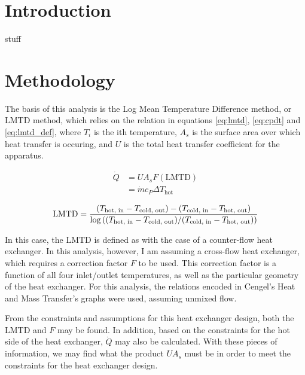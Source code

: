 \documentclass[12pt,letterpaper]{article}
\begin{document}
\sffamily

\section{Introduction}

stuff

\section{Methodology}

The basis of this analysis is the Log Mean Temperature Difference method, or LMTD method, which relies on the relation in equations \ref{eq:lmtd}, \ref{eq:cpdt} and \ref{eq:lmtd_def}, where \(T_i\) is the ith temperature, \(A_s\) is the surface area over which heat transfer is occuring, and \(U\) is the total heat transfer coefficient for the apparatus.

\begin{align}
\label{eq:lmtd}
\dot{Q} &= UA_s F(\textrm{LMTD})\\
\label{eq:cpdt}
        &= \dot{m}c_P \Delta T_{\textrm{hot}}
\end{align}

\begin{equation}
\label{eq:lmtd_def}
\textrm{LMTD} = 
\frac{ (T_{\textrm{hot, in}} - T_{\textrm{cold, out}} ) -
       (T_{\textrm{cold, in}} - T_{\textrm{hot, out}})
     }{
\log\left( 
    (T_{\textrm{hot, in}} - T_{\textrm{cold, out}} )
    \middle/ 
    (T_{\textrm{cold, in}} - T_{\textrm{hot, out}}) 
    \right) }
\end{equation}

In this case, the LMTD is defined as with the case of a counter-flow heat exchanger.  In this analysis, however, I am assuming a cross-flow heat exchanger, which requires a correction factor \(F\) to be used. This correction factor is a function of all four inlet/outlet temperatures, as well as the particular geometry of the heat exchanger.  For this analysis, the relations encoded in Cengel's Heat and Mass Transfer's graphs were used, assuming unmixed flow. 

From the constraints and assumptions for this heat exchanger design, both the LMTD and \(F\) may be found.  In addition, based on the constraints for the hot side of the heat exchanger, \(\dot{Q}\) may also be calculated. With these pieces of information, we may find what the product \(UA_s\) must be in order to meet the constraints for the heat exchanger design. 
\end{document}
